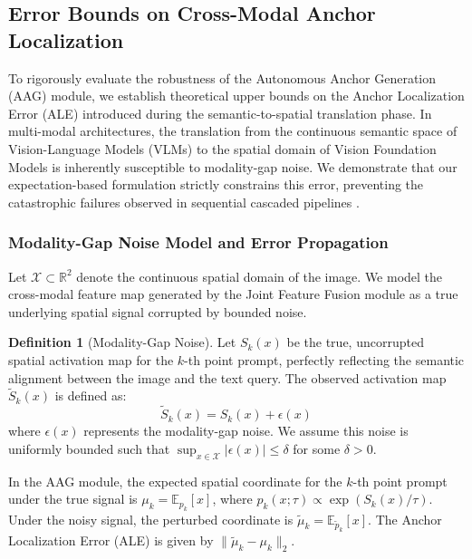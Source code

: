 \documentclass[onecolumn]{IEEEtran}
\numberwithin{equation}{section}
\theoremstyle{definition}
\newtheorem{definition}[theorem]{Definition}
\theoremstyle{remark}
\begin{document}
\subsection{Error Bounds on Cross-Modal Anchor Localization}

To rigorously evaluate the robustness of the Autonomous Anchor Generation (AAG) module, we establish theoretical upper bounds on the Anchor Localization Error (ALE) introduced during the semantic-to-spatial translation phase. In multi-modal architectures, the translation from the continuous semantic space of Vision-Language Models (VLMs) to the spatial domain of Vision Foundation Models is inherently susceptible to modality-gap noise. We demonstrate that our expectation-based formulation strictly constrains this error, preventing the catastrophic failures observed in sequential cascaded pipelines \cite{aleem2024test, li2024clipsam}.

\subsubsection{Modality-Gap Noise Model and Error Propagation}

Let $\mathcal{X} \subset \mathbb{R}^2$ denote the continuous spatial domain of the image. We model the cross-modal feature map generated by the Joint Feature Fusion module as a true underlying spatial signal corrupted by bounded noise.

\begin{definition}[Modality-Gap Noise]
Let $S_k(x)$ be the true, uncorrupted spatial activation map for the $k$-th point prompt, perfectly reflecting the semantic alignment between the image and the text query. The observed activation map $\tilde{S}_k(x)$ is defined as:
\begin{equation}
    \tilde{S}_k(x) = S_k(x) + \epsilon(x)
\end{equation}
where $\epsilon(x)$ represents the modality-gap noise. We assume this noise is uniformly bounded such that $\sup_{x \in \mathcal{X}} |\epsilon(x)| \le \delta$ for some $\delta > 0$.
\end{definition}

In the AAG module, the expected spatial coordinate for the $k$-th point prompt under the true signal is $\mu_k = \mathbb{E}_{p_k}[x]$, where $p_k(x; \tau) \propto \exp(S_k(x)/\tau)$. Under the noisy signal, the perturbed coordinate is $\tilde{\mu}_k = \mathbb{E}_{\tilde{p}_k}[x]$. The Anchor Localization Error (ALE) is given by $\|\tilde{\mu}_k - \mu_k\|_2$.
\end{document}
